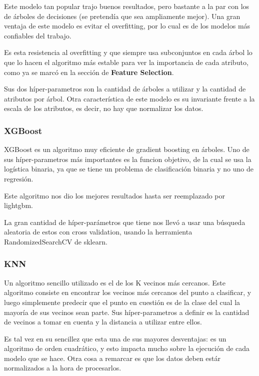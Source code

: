 \documentclass[a4paper]{article}
\begin{document}
Este modelo tan popular trajo buenos resultados, pero bastante a la par con los de árboles de decisiones (se pretendía que sea ampliamente mejor). Una gran ventaja de este modelo es evitar el overfitting, por lo cual es de los modelos más confiables del trabajo. 

Es esta resistencia al overfitting y que siempre usa subconjuntos en cada árbol lo que lo hacen el algoritmo más estable para ver la importancia de cada atributo, como ya se marcó en la sección de \textbf{Feature Selection}.

Sus dos híper-parametros son la cantidad de árboles a utilizar y la cantidad de atributos por árbol. Otra característica de este modelo es su invariante frente a la escala de los atributos, es decir, no hay que normalizar los datos.

\subsubsection{XGBoost}

XGBoost es un algoritmo muy eficiente de gradient boosting en árboles. Uno de sus híper-parametros más importantes es la funcion objetivo, de la cual se usa la logística binaria, ya que se tiene un problema de clasificación binaria y no uno de regresión.

Este algoritmo nos dio los mejores resultados hasta ser reemplazado por lightgbm.

La gran cantidad de híper-parámetros que tiene nos llevó a usar una búsqueda aleatoria de estos con cross validation, usando la herramienta RandomizedSearchCV de sklearn.

\subsubsection{KNN}

Un algoritmo sencillo utilizado es el de los K vecinos más cercanos. Este algoritmo consiste en encontrar los vecinos más cercanos del punto a clasificar, y luego simplemente predecir que el punto en cuestión es de la clase del cual la mayoría de sus vecinos sean parte. Sus híper-parametros a definir es la cantidad de vecinos a tomar en cuenta y la distancia a utilizar entre ellos. 

Es tal vez en su sencillez que esta una de sus mayores desventajas: es un algoritmo de orden cuadrático, y esto impacta mucho sobre la ejecución de cada modelo que se hace. Otra cosa a remarcar es que los datos deben estár normalizados a la hora de procesarlos.
\end{document}
